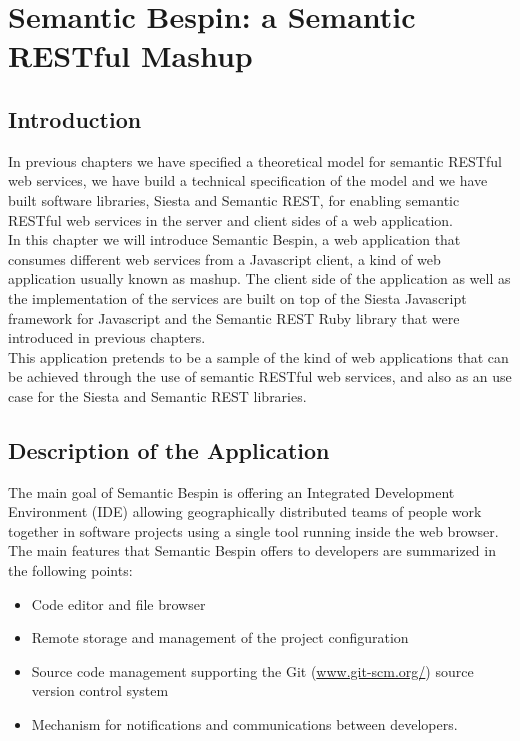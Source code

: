 \chapter{Semantic Bespin: a Semantic RESTful Mashup}

\section{Introduction}

In previous chapters we have specified a theoretical model for semantic RESTful web services, we have build a technical
specification of the model and we have built software libraries, Siesta and Semantic REST, for enabling semantic RESTful web services in the
server and client sides of a web application.\\ 

In this chapter we will introduce Semantic Bespin, a web application that
consumes different web services from a Javascript client, a kind of web application usually known as mashup.
The client side of the application as well as the implementation of the services are built on top of the Siesta
Javascript framework for Javascript and the Semantic REST Ruby library that were introduced in previous chapters.\\

This application pretends to be a sample of the kind of web applications that can be achieved through the use of
semantic RESTful web services, and also as an use case for the Siesta and Semantic REST libraries.

\section{Description of the Application}

The main goal of Semantic Bespin is offering an Integrated Development Environment (IDE) allowing geographically distributed
teams of people work together in software projects using a single tool running inside the web browser.\\

The main features that Semantic Bespin offers to developers are summarized in the following points:

\begin{itemize}
\item Code editor and file browser
\item Remote storage and management of the project configuration 
\item Source code management supporting the Git (\url{www.git-scm.org/}) source version control system
\item Mechanism for notifications and communications between developers.
\end{itemize}


